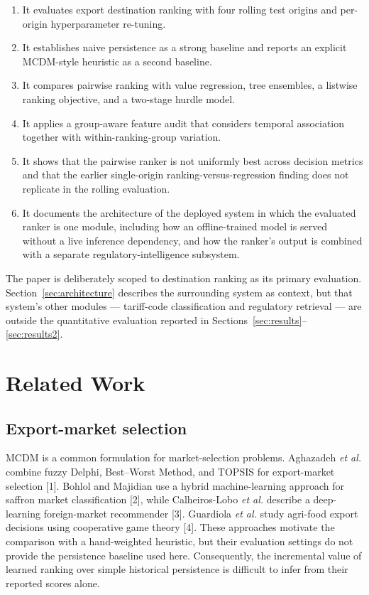 \documentclass[conference]{IEEEtran}
\begin{document}
\begin{enumerate}
\item It evaluates export destination ranking with four rolling test origins and per-origin hyperparameter re-tuning.
\item It establishes naive persistence as a strong baseline and reports an explicit MCDM-style heuristic as a second baseline.
\item It compares pairwise ranking with value regression, tree ensembles, a listwise ranking objective, and a two-stage hurdle model.
\item It applies a group-aware feature audit that considers temporal association together with within-ranking-group variation.
\item It shows that the pairwise ranker is not uniformly best across decision metrics and that the earlier single-origin ranking-versus-regression finding does not replicate in the rolling evaluation.
\item It documents the architecture of the deployed system in which the evaluated ranker is one module, including how an offline-trained model is served without a live inference dependency, and how the ranker's output is combined with a separate regulatory-intelligence subsystem.
\end{enumerate}

The paper is deliberately scoped to destination ranking as its primary evaluation. Section~\ref{sec:architecture} describes the surrounding system as context, but that system's other modules --- tariff-code classification and regulatory retrieval --- are outside the quantitative evaluation reported in Sections~\ref{sec:results}--\ref{sec:results2}.

\section{Related Work}

\subsection{Export-market selection}

MCDM is a common formulation for market-selection problems. Aghazadeh \emph{et al.} combine fuzzy Delphi, Best--Worst Method, and TOPSIS for export-market selection [1]. Bohlol and Majidian use a hybrid machine-learning approach for saffron market classification [2], while Calheiros-Lobo \emph{et al.} describe a deep-learning foreign-market recommender [3]. Guardiola \emph{et al.} study agri-food export decisions using cooperative game theory [4]. These approaches motivate the comparison with a hand-weighted heuristic, but their evaluation settings do not provide the persistence baseline used here. Consequently, the incremental value of learned ranking over simple historical persistence is difficult to infer from their reported scores alone.
\end{document}
